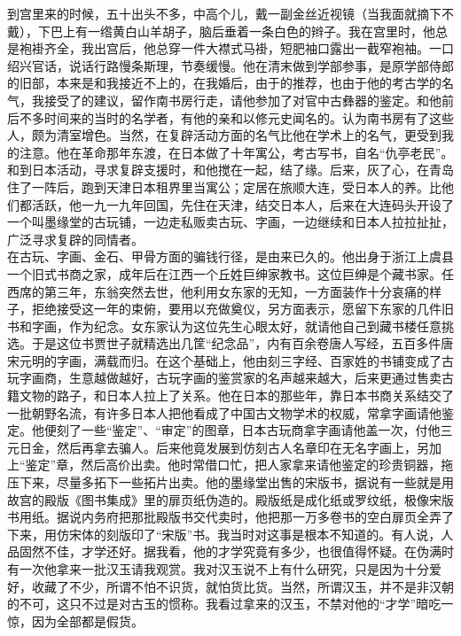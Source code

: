 到宫里来的时候，五十出头不多，中高个儿，戴一副金丝近视镜（当我面就摘下不戴），下巴上有一绺黄白山羊胡子，脑后垂着一条白色的辫子。我在宫里时，他总是袍褂齐全，我出宫后，他总穿一件大襟式马褂，短肥袖口露出一截窄袍袖。一口绍兴官话，说话行路慢条斯理，节奏缓慢。他在清末做到学部参事，是原学部侍郎的旧部，本来是和我接近不上的，在我婚后，由于的推荐，也由于他的考古学的名气，我接受了的建议，留作南书房行走，请他参加了对官中古彝器的鉴定。和他前后不多时间来的当时的名学者，有他的亲和以修元史闻名的。认为南书房有了这些人，颇为清室增色。当然，在复辟活动方面的名气比他在学术上的名气，更受到我的注意。他在革命那年东渡，在日本做了十年寓公，考古写书，自名“仇亭老民”。和到日本活动，寻求复辟支援时，和他搅在一起，结了缘。后来，灰了心，在青岛住了一阵后，跑到天津日本租界里当寓公；定居在旅顺大连，受日本人的养。比他们都活跃，他一九一九年回国，先住在天津，结交日本人，后来在大连码头开设了一个叫墨缘堂的古玩铺，一边走私贩卖古玩、字画，一边继续和日本人拉拉扯扯，广泛寻求复辟的同情者。\\

在古玩、字画、金石、甲骨方面的骗钱行径，是由来已久的。他出身于浙江上虞县一个旧式书商之家，成年后在江西一个丘姓巨绅家教书。这位巨绅是个藏书家。任西席的第三年，东翁突然去世，他利用女东家的无知，一方面装作十分哀痛的样子，拒绝接受这一年的束俯，要用以充做奠仪，另方面表示，愿留下东家的几件旧书和字画，作为纪念。女东家认为这位先生心眼太好，就请他自己到藏书楼任意挑选。于是这位书贾世子就精选出几筐“纪念品”，内有百余卷唐人写经，五百多件唐宋元明的字画，满载而归。在这个基础上，他由刻三字经、百家姓的书铺变成了古玩字画商，生意越做越好，古玩字画的鉴赏家的名声越来越大，后来更通过售卖古籍文物的路子，和日本人拉上了关系。他在日本的那些年，靠日本书商关系结交了一批朝野名流，有许多日本人把他看成了中国古文物学术的权威，常拿字画请他鉴定。他便刻了一些“鉴定”、“审定”的图章，日本古玩商拿字画请他盖一次，付他三元日金，然后再拿去骗人。后来他竟发展到仿刻古人名章印在无名字画上，另加上“鉴定”章，然后高价出卖。他时常借口忙，把人家拿来请他鉴定的珍贵铜器，拖压下来，尽量多拓下一些拓片出卖。他的墨缘堂出售的宋版书，据说有一些就是用故宫的殿版《图书集成》里的扉页纸伪造的。殿版纸是成化纸或罗纹纸，极像宋版书用纸。据说内务府把那批殿版书交代卖时，他把那一万多卷书的空白扉页全弄了下来，用仿宋体的刻版印了“宋版”书。我当时对这事是根本不知道的。有人说，人品固然不佳，才学还好。据我看，他的才学究竟有多少，也很值得怀疑。在伪满时有一次他拿来一批汉玉请我观赏。我对汉玉说不上有什么研究，只是因为十分爱好，收藏了不少，所谓不怕不识货，就怕货比货。当然，所谓汉玉，并不是非汉朝的不可，这只不过是对古玉的惯称。我看过拿来的汉玉，不禁对他的“才学”暗吃一惊，因为全部都是假货。\\

